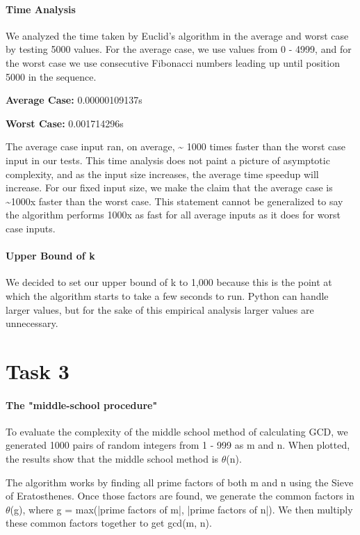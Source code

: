 \documentclass{report}
\begin{document}
\begin{flushleft}
		\paragraph{Time Analysis}

		We analyzed the time taken by Euclid's algorithm in the average and worst case by testing 5000 values. For the average case,
		we use values from 0 - 4999, and for the worst case we use consecutive Fibonacci numbers leading up until 
		position 5000 in the sequence.
		
		\textbf{Average Case:} 0.00000109137s

		\textbf{Worst Case: } 0.001714296s

		The average case input ran, on average, \textasciitilde{} 1000 times faster than the worst case input in our tests. This time analysis does not
		paint a picture of asymptotic complexity, and as the input size increases, the average time speedup will increase. For our fixed input size, we
		make the claim that the average case is \textasciitilde{}1000x faster than the worst case. This statement cannot be generalized to say the algorithm performs 1000x as fast for all
		average inputs as it does for worst case inputs.

		\paragraph{Upper Bound of k} We decided to set our upper bound of k to 1,000 because this is the point 
		at which the algorithm starts to take a few seconds to run. Python can handle larger values, but for the sake
		of this empirical analysis larger values are unnecessary.
		\pagebreak
		\section{Task 3}

		\paragraph{The "middle-school procedure"}
		To evaluate the complexity of the middle school method of calculating GCD, we generated 1000 pairs of random integers from 1 - 999 as m and n. When plotted, the results
		show that the middle school method is $\theta$(n).

		The algorithm works by finding all prime factors of both m and n using the Sieve of Eratosthenes. Once those factors are found,
		we generate the common factors in $\theta$(g), where g = max(|prime factors of m|, |prime factors of n|). We then multiply these common factors together
		to get gcd(m, n).


\end{flushleft}
\end{document}
